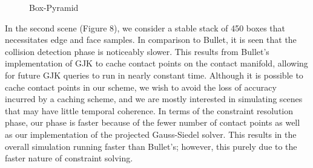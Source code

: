 \documentclass[9pt,twocolumn]{article}
\begin{document}
\setlength\fboxsep{0pt}
\setlength\fboxrule{0.5pt}
\begin{figure}[ht]
\centering
{}
\label{boxPyramid}
\caption{Box-Pyramid}
\end{figure}

In the second scene (Figure 8), we consider a stable stack of 450 boxes that necessitates edge and face samples. In comparison to Bullet, it is seen that the collision detection phase is noticeably slower. This results from Bullet's implementation of GJK to cache contact points on the contact manifold, allowing for future GJK queries to run in nearly constant time. Although it is possible to cache contact points in our scheme, we wish to avoid the loss of accuracy incurred by a caching scheme, and we are mostly interested in simulating scenes that may have little temporal coherence. In terms of the constraint resolution phase, our phase is faster because of the fewer number of contact points as well as our implementation of the  projected Gauss-Siedel solver. This results in the overall simulation running faster than Bullet's; however, this purely due to the faster nature of constraint solving. \newline
\end{document}
